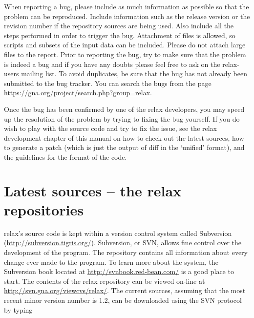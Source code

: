 When reporting a bug, please include as much information as possible so that the problem can be reproduced.  Include information such as the release version or the revision number if the repository sources are being used.  Also include all the steps performed in order to trigger the bug.  Attachment of files is allowed, so scripts and subsets of the input data can be included.  Please do not attach large files to the report.  Prior to reporting the bug, try to make sure that the problem is indeed a bug and if you have any doubts please feel free to ask on the relax-users mailing list.  To avoid duplicates, be sure that the bug has not already been submitted to the bug tracker.  You can search the bugs from the page \href{https://gna.org/project/search.php?group=relax}{https://gna.org/project/search.php?group=relax}.

Once the bug has been confirmed by one of the relax developers, you may speed up the resolution of the problem by trying to fixing the bug yourself.  If you do wish to play with the source code and try to fix the issue, see the relax development chapter of this manual on how to check out the latest sources, how to generate a patch (which is just the output of diff in the `unified' format), and the guidelines for the format of the code.




\section{Latest sources -- the relax repositories}

relax's source code is kept within a version control system called Subversion (\href{http://subversion.tigris.org/}{http://subversion.tigris.org/}).  Subversion, or SVN, allows fine control over the development of the program.  The repository contains all information about every change ever made to the program.  To learn more about the system, the Subversion book located at \href{http://svnbook.red-bean.com/}{http://svnbook.red-bean.com/} is a good place to start.  The contents of the relax repository can be viewed on-line at \href{http://svn.gna.org/viewcvs/relax/}{http://svn.gna.org/viewcvs/relax/}.  The current sources, assuming that the most recent minor version number is 1.2, can be downloaded using the SVN protocol by typing


